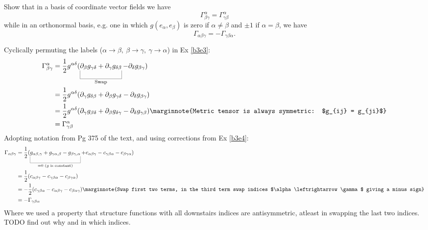 \documentclass[10pt]{article}
\begin{document}
\begin{example}\label{b3e5}
	Show that in a basis of coordinate vector fields we have
	$$
	\Gamma_{\beta\gamma}^\alpha=\Gamma_{\gamma\beta}^\alpha
	$$
	while in an orthonormal basis, e.g. one in which $g(e_\alpha,e_\beta)$ is zero if $\alpha\ne\beta$ and $\pm 1$ if $\alpha=\beta$, we have
	$$
	\Gamma_{\alpha\beta\gamma}=-\Gamma_{\gamma\beta\alpha}.
	$$
\end{example}
\sol Cyclically permuting the labels ($\alpha \to \beta,\: \beta \to \gamma,\: \gamma \to \alpha$) in Ex \ref{b3e3}:
$$
\begin{aligned}
	\Gamma_{\beta\gamma}^\alpha &= \frac12 g^{\alpha\delta}(\ub{\partial_\beta g_{\gamma\delta}+\partial_\gamma g_{\delta\beta}}{\text{Swap}}-\partial_\delta g_{\beta\gamma})\\
	&= \frac12 g^{\alpha\delta}(\partial_\gamma g_{\delta\beta}+\partial_\beta g_{\gamma\delta}-\partial_\delta g_{\beta\gamma})\\
	&= \frac12 g^{\alpha\delta}(\partial_\gamma g_{\beta\delta}+\partial_\beta g_{\delta\gamma}-\partial_\delta g_{\gamma\beta})\marginnote{Metric tensor is always symmetric: $g_{ij} = g_{ji}$}\\
	&= \Gamma_{\gamma\beta}^\alpha
\end{aligned}
$$
Adopting notation from Pg 375 of the text, and using corrections from Ex \ref{b3e4}:
$$
\begin{aligned}
	\Gamma_{\alpha\beta\gamma} &= \frac12(\ub{g_{\alpha\beta,\gamma}+g_{\gamma\alpha,\beta}-g_{\beta\gamma,\alpha}}{= 0 \text{ ($g$ is constant)}}+c_{\alpha\beta\gamma}-c_{\gamma\beta\alpha}-c_{\beta\gamma\alpha})\\
	&= \frac12(c_{\alpha\beta\gamma}-c_{\gamma\beta\alpha}-c_{\beta\gamma\alpha})\\
	&= -\frac12(c_{\gamma\beta\alpha}-c_{\alpha\beta\gamma}-c_{\beta\alpha\gamma})\marginnote{Swap first two terms, in the third term swap indices $\alpha\leftrightarrow\gamma$ giving a minus sign}\\
	&= -\Gamma_{\gamma\beta\alpha}
\end{aligned}$$
Where we used a property that structure functions with all downstairs indices are antisymmetric, atleast in swapping the last two indices. TODO find out why and in which indices.
\end{document}

